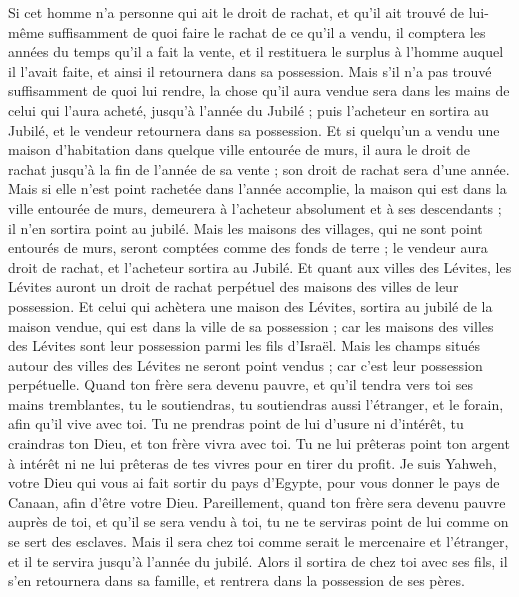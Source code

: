 \begin{multicols}{2}
Si cet homme n'a personne qui ait le droit de rachat, et qu'il ait trouvé de lui-même suffisamment de quoi faire le rachat de ce qu'il a vendu,
il comptera les années du temps qu'il a fait la vente, et il restituera le surplus à l'homme auquel il l'avait faite, et ainsi il retournera dans sa possession.
Mais s'il n'a pas trouvé suffisamment de quoi lui rendre, la chose qu'il aura vendue sera dans les mains de celui qui l'aura acheté, jusqu'à l'année du Jubilé ; puis l'acheteur en sortira au Jubilé, et le vendeur retournera dans sa possession.
Et si quelqu'un a vendu une maison d'habitation dans quelque ville entourée de murs, il aura le droit de rachat jusqu'à la fin de l'année de sa vente ; son droit de rachat sera d'une année.
Mais si elle n'est point rachetée dans l'année accomplie, la maison qui est dans la ville entourée de murs, demeurera à l'acheteur absolument et à ses descendants ; il n'en sortira point au jubilé.
Mais les maisons des villages, qui ne sont point entourés de murs, seront comptées comme des fonds de terre ; le vendeur aura droit de rachat, et l'acheteur sortira au Jubilé.
Et quant aux villes des Lévites, les Lévites auront un droit de rachat perpétuel des maisons des villes de leur possession.
Et celui qui achètera une maison des Lévites, sortira au jubilé de la maison vendue, qui est dans la ville de sa possession ; car les maisons des villes des Lévites sont leur possession parmi les fils d'Israël.
Mais les champs situés autour des villes des Lévites ne seront point vendus ; car c'est leur possession perpétuelle.
Quand ton frère sera devenu pauvre, et qu'il tendra vers toi ses mains tremblantes, tu le soutiendras, tu soutiendras aussi l'étranger, et le forain, afin qu'il vive avec toi.
Tu ne prendras point de lui d'usure ni d'intérêt, tu craindras ton Dieu, et ton frère vivra avec toi.
Tu ne lui prêteras point ton argent à intérêt ni ne lui prêteras de tes vivres pour en tirer du profit.
Je suis Yahweh, votre Dieu qui vous ai fait sortir du pays d'Egypte, pour vous donner le pays de Canaan, afin d'être votre Dieu.
Pareillement, quand ton frère sera devenu pauvre auprès de toi, et qu'il se sera vendu à toi, tu ne te serviras point de lui comme on se sert des esclaves.
Mais il sera chez toi comme serait le mercenaire et l'étranger, et il te servira jusqu'à l'année du jubilé.
Alors il sortira de chez toi avec ses fils, il s'en retournera dans sa famille, et rentrera dans la possession de ses pères.

\end{multicols}
